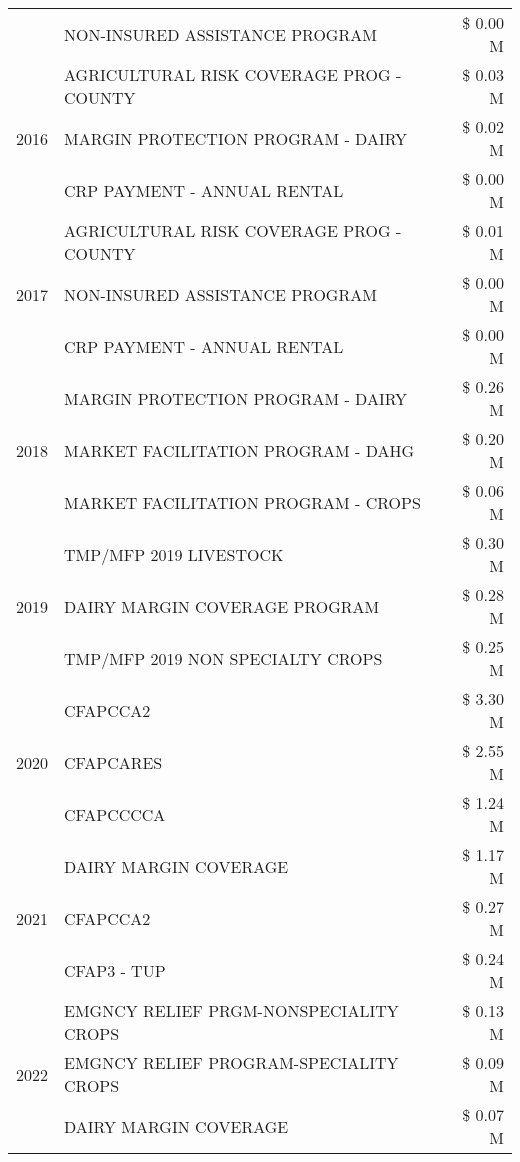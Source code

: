\begin{tabular}{llr}
 & NON-INSURED ASSISTANCE PROGRAM & \$ 0.00 M \\
\cline{1-3}
\multirow[t]{3}{*}{2016} & AGRICULTURAL RISK COVERAGE PROG - COUNTY & \$ 0.03 M \\
 & MARGIN PROTECTION PROGRAM - DAIRY & \$ 0.02 M \\
 & CRP PAYMENT - ANNUAL RENTAL & \$ 0.00 M \\
\cline{1-3}
\multirow[t]{3}{*}{2017} & AGRICULTURAL RISK COVERAGE PROG - COUNTY & \$ 0.01 M \\
 & NON-INSURED ASSISTANCE PROGRAM & \$ 0.00 M \\
 & CRP PAYMENT - ANNUAL RENTAL & \$ 0.00 M \\
\cline{1-3}
\multirow[t]{3}{*}{2018} & MARGIN PROTECTION PROGRAM - DAIRY & \$ 0.26 M \\
 & MARKET FACILITATION PROGRAM - DAHG & \$ 0.20 M \\
 & MARKET FACILITATION PROGRAM - CROPS & \$ 0.06 M \\
\cline{1-3}
\multirow[t]{3}{*}{2019} & TMP/MFP 2019 LIVESTOCK & \$ 0.30 M \\
 & DAIRY MARGIN COVERAGE PROGRAM & \$ 0.28 M \\
 & TMP/MFP 2019 NON SPECIALTY CROPS & \$ 0.25 M \\
\cline{1-3}
\multirow[t]{3}{*}{2020} & CFAPCCA2 & \$ 3.30 M \\
 & CFAPCARES & \$ 2.55 M \\
 & CFAPCCCCA & \$ 1.24 M \\
\cline{1-3}
\multirow[t]{3}{*}{2021} & DAIRY MARGIN COVERAGE & \$ 1.17 M \\
 & CFAPCCA2 & \$ 0.27 M \\
 & CFAP3 - TUP & \$ 0.24 M \\
\cline{1-3}
\multirow[t]{3}{*}{2022} & EMGNCY RELIEF PRGM-NONSPECIALITY CROPS & \$ 0.13 M \\
 & EMGNCY RELIEF PROGRAM-SPECIALITY CROPS & \$ 0.09 M \\
 & DAIRY MARGIN COVERAGE & \$ 0.07 M \\
\cline{1-3}
\bottomrule
\end{tabular}
